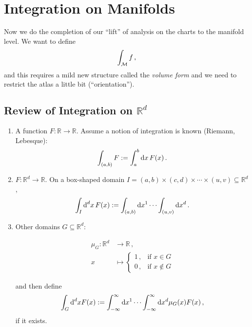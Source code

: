 \documentclass[11pt, a4paper, twocolumn]{article} %
\begin{document}
    \section{Integration on Manifolds}
    Now we do the completion of our ``lift'' of analysis on the charts to the manifold level.
    We want to define
    \begin{equation}
        \int_{\mathcal{M}} f\,,
    \end{equation}
    and this requires a mild new structure called the \textit{volume form}
    and we need to restrict the atlas a little bit (``orientation'').

    \subsection[Review of Integration]{Review of Integration on $\mathbb{R}^d$}
    \begin{enumerate}
        \item A function $F: \mathbb{R} \to \mathbb{R}$. Assume a notion of integration is known
            (Riemann, Lebesque):
            \begin{equation}
                \int_{(a,b)}F := \int_a^b \operatorname{d\!} x\, F(x)\,.
            \end{equation}
        \item $F: \mathbb{R}^d \to \mathbb{R}$.
            On a box-shaped domain
            $I = (a,b)\times(c,d)\times\cdots\times (u,v) \subseteq \mathbb{R}^d$,
            \begin{equation}
                \int_{I} \operatorname{d}^d\! x\, F(x) := \int_{(a,b)}\operatorname{d\!} x^1 \cdots \int_{(u,v)}\operatorname{d\!} x^d\,.
            \end{equation}
        \item Other domains $G\subseteq \mathbb{R}^d$:
            \begin{defn}
                \begin{align}
                    \nonumber \mu_G: \mathbb{R}^d &\to \mathbb{R}\,,\\
                    x&\mapsto
                    \begin{cases}
                        1\,, & \text{if } x\in G\\
                        0\,, & \text{if } x\not\in G
                    \end{cases}
                \end{align}
            \end{defn}
            and then define
            \begin{equation}
                \int_G \operatorname{d}^d\! x F(x):= \int_{-\infty}^\infty \operatorname{d\!} x^1 \cdots \int_{-\infty}^\infty \operatorname{d\!} x^d \mu_G(x) F(x)\,,
            \end{equation}
            if it exists.
    \end{enumerate}
\end{document}

